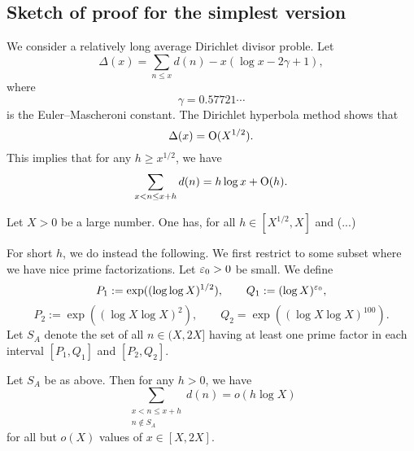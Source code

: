 \documentclass[reqno]{amsart} 
\begin{document}
\subsection{Sketch of proof for the simplest version}
We consider a relatively long average Dirichlet divisor proble.  Let
\begin{equation*}
\Delta (x ) = \sum_{n \leq x } d (n ) - x (\log x - 2 \gamma + 1 ),
\end{equation*}
where
\begin{equation*}
\gamma = 0.57721 \dotsb 
\end{equation*}
is the Euler--Mascheroni constant.  The Dirichlet hyperbola method shows that
\begin{equation*}
\Delta(x) = \operatorname{O} (X^{1/2} ).  
\end{equation*}
This implies that for any $h \geq x^{1/2} $, we have
\begin{equation*}
\sum_{x < n \leq x + h } d (n) = h \log x + \operatorname{O}(h).
\end{equation*}
\begin{proposition}
Let $X > 0$ be a large number.  One has, for all $h \in [X^{1/2} , X]$ and (...)
\end{proposition}

For short $h$, we do instead the following.  We first restrict to some subset where we have nice prime factorizations.  Let $\varepsilon_0 > 0$ be small.  We define
\begin{equation*}
P_1 := \exp ((\log \log X )^{1/2} ), \qquad Q_1 := (\log X )^{\varepsilon_0 },
\end{equation*}
\begin{equation*}
  P_2 := \exp ((\log X \log X)^2 ),
  \qquad
  Q_2 = \exp ((\log X \log X)^{100}).
\end{equation*}
Let $S_A$ denote the set of all $n \in (X, 2X]$ having at least one prime factor in each interval $[P_1, Q_1]$ and $[P_2, Q_2]$.
\begin{lemma}
  Let $S_A$ be as above.  Then for any $h > 0$, we have
  \begin{equation*}
    \sum_{
      \substack{
        x < n \leq x + h  \\
         n \notin S_A
      }
    }
    d (n) =
    o(h \log X)
  \end{equation*}
  for all but $o(X)$ values of $x \in [X, 2 X]$.
\end{lemma}
\end{document}
